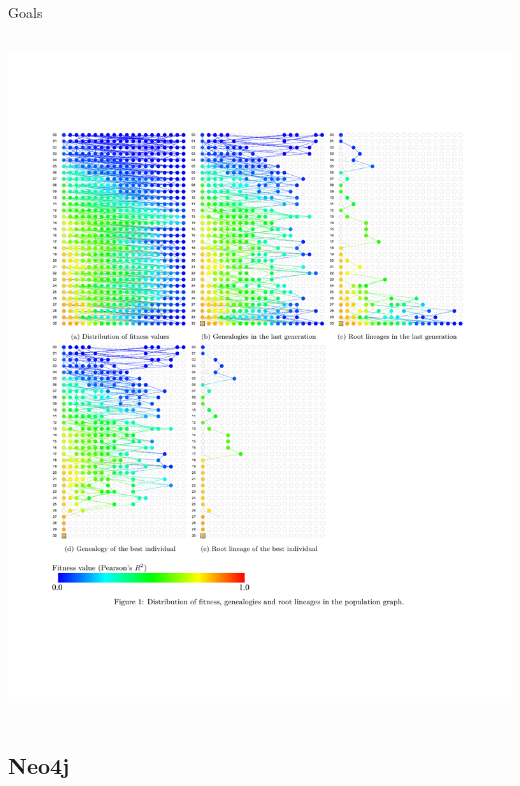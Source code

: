 \documentclass{beamer}
\begin{document}
\begin{frame}{Goals}
\begin{columns}
\begin{column}{0.4 \linewidth}
			\includegraphics[height= 0.75 \textheight]{Figures/HeuristicLabGraph.pdf} \\
			\tiny{\cite{Burlacu:2013:VGL:2464576.2482714}}
		\end{column}		
	\end{columns}
\end{frame}

\subsection{Neo4j}
\end{document}
